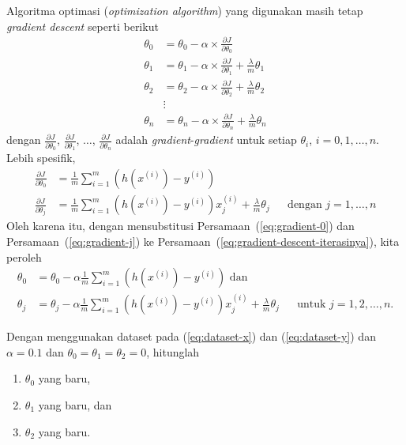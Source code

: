\documentclass[twoside,12pt]{article}
\newenvironment{myblock}[1]{%
    \tcolorbox[beamer,%
    noparskip,breakable,
    colback=LightBlue,colframe=DarkBlue,%
    colbacklower=DarkBlue!75!LightBlue,%
    title=#1]}%
    {\endtcolorbox}
\begin{document}
Algoritma optimasi (\textit{optimization algorithm}) yang digunakan masih tetap \textit{gradient descent} seperti berikut
\begin{align}
	\theta_0 &= \theta_0 - \alpha \times \frac{\partial J}{\partial \theta_0} \nonumber \\
	\theta_1 &= \theta_1 - \alpha \times \frac{\partial J}{\partial \theta_1} + \frac{\lambda}{m}\theta_1 \nonumber \\  
	\theta_2 &= \theta_2 - \alpha \times \frac{\partial J}{\partial \theta_2} + \frac{\lambda}{m}\theta_2 \nonumber \\
	         & \vdots \nonumber  \\
	\theta_n &= \theta_n - \alpha \times \frac{\partial J}{\partial \theta_n} + \frac{\lambda}{m}\theta_n  \label{eq:gradient-descent-iterasinya}
\end{align}
dengan $\frac{\partial J}{\partial \theta_0}$, $\frac{\partial J}{\partial \theta_1}$, $\ldots$, $\frac{\partial J}{\partial \theta_n}$ adalah \textit{gradient}-\textit{gradient} untuk setiap $\theta_i$, $i = 0,1, \ldots, n$. Lebih spesifik,
\begin{align}
	\frac{\partial J}{\partial \theta_0} &= \frac{1}{m} \sum_{i=1}^m (h(x^{(i)}) - y^{(i)} ) \label{eq:gradient-0}  \\
	\frac{\partial J}{\partial \theta_j} &= \frac{1}{m} \sum_{i=1}^m (h(x^{(i)}) - y^{(i)} ) x_j^{(i)} + \frac{\lambda}{m} \theta_j && \text{dengan }j = 1, \ldots, n 	\label{eq:gradient-j}
\end{align}
Oleh karena itu, dengan mensubstitusi Persamaan~(\ref{eq:gradient-0}) dan Persamaan~(\ref{eq:gradient-j}) ke Persamaan~(\ref{eq:gradient-descent-iterasinya}), kita peroleh
\begin{align}
	\theta_0 &= \theta_0 - \alpha \frac{1}{m} \sum_{i=1}^{m}(h(x^{(i)}) - y^{(i)}) \text{ dan } \\
	\theta_j &= \theta_j - \alpha \frac{1}{m} \sum_{i=1}^{m}(h(x^{(i)}) - y^{(i)}) x_j^{(i)} + \frac{\lambda}{m} \theta_j  && \text{untuk }j = 1, 2, \ldots, n.
\end{align}

\begin{myblock}{Latihan}
Dengan menggunakan dataset pada (\ref{eq:dataset-x}) dan (\ref{eq:dataset-y}) dan $\alpha = 0.1$ dan $\theta_0 = \theta_1 = \theta_2 = 0$, hitunglah
 	\begin{enumerate}[-,topsep=0pt, nosep,label=\alph*. ]
		\item $\theta_0$ yang baru,
		\item $\theta_1$ yang baru, dan
		\item $\theta_2$ yang baru.
	\end{enumerate}
\end{myblock}
\end{document}
